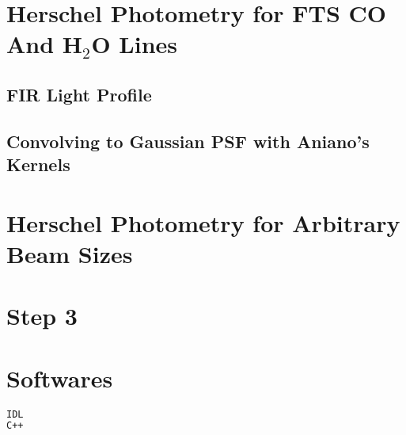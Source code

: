 \documentclass[11pt,a4paper]{article}
\begin{document}
\clearpage

\section{Herschel Photometry for FTS CO And H$_2$O Lines}

\subsection{FIR Light Profile}


\subsection{Convolving to Gaussian PSF with Aniano's Kernels}


\clearpage

\section{Herschel Photometry for Arbitrary Beam Sizes}


\clearpage

\section{Step 3}


\clearpage

\appendix

\section{Softwares}
\label{Appendix_Software_Dependencies}

\begin{lstlisting}[language=bash]
IDL
C++
\end{lstlisting}
\end{document}
